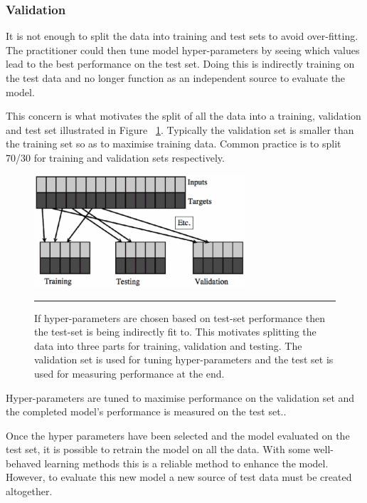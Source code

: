 \subsubsection{Validation}
It is not enough to split the data into training and test sets to avoid over-fitting.
The practitioner could then tune model hyper-parameters by seeing which values lead to the best performance on the test set.
Doing this is indirectly training on the test data and no longer function as an independent source to evaluate the model\citep{witten2005data}.

This concern is what motivates the split of all the data into a training, validation and test set illustrated in Figure ~\ref{fig:Training_validation_and_Test}.
Typically the validation set is smaller than the training set so as to maximise training data.
Common practice is to split 70/30 for training and validation sets respectively.

\begin{figure}[htbp]
	\centering
		\includegraphics[width = 0.7\textwidth]{./Figures/training_validation_and_test_sets_ML_an_algorithmic_perspective.jpg}
		\rule{35em}{0.5pt}
	\caption[Validation]{If hyper-parameters are chosen based on test-set performance then the test-set is being indirectly fit to. This motivates splitting the data into three parts for training, validation and testing. The validation set is used for tuning hyper-parameters and the test set is used for measuring performance at the end.}
	\label{fig:Training_validation_and_Test}
\end{figure}

Hyper-parameters are tuned to maximise performance on the validation set and the completed model's performance is measured on the test set.\citep{barber2012bayesian}.

Once the hyper parameters have been selected and the model evaluated on the test set, it is possible to retrain the model on all the data.
With some well-behaved learning methods this is a reliable method to enhance the model\citep{witten2005data}.
However, to evaluate this new model a new source of test data must be created altogether.

